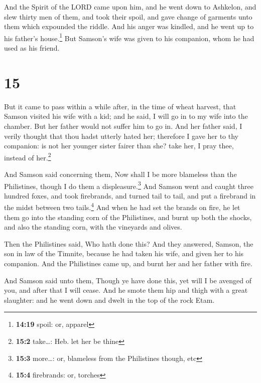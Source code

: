  And the Spirit of the LORD came upon him, and he went
down to Ashkelon, and slew thirty men of them, and took their spoil, and
gave change of garments unto them which expounded the riddle. And his
anger was kindled, and he went up to his father's house.\footnote{\textbf{14:19}
  spoil: or, apparel}  But Samson's wife was given to his
companion, whom he had used as his friend.

\hypertarget{section-14}{%
\section{15}\label{section-14}}

 But it came to pass within a while after, in the time of
wheat harvest, that Samson visited his wife with a kid; and he said, I
will go in to my wife into the chamber. But her father would not suffer
him to go in.  And her father said, I verily thought that
thou hadst utterly hated her; therefore I gave her to thy companion: is
not her younger sister fairer than she? take her, I pray thee, instead
of her.\footnote{\textbf{15:2} take\ldots: Heb. let her be thine}

 And Samson said concerning them, Now shall I be more
blameless than the Philistines, though I do them a
displeasure.\footnote{\textbf{15:3} more\ldots: or, blameless from the
  Philistines though, etc}  And Samson went and caught
three hundred foxes, and took firebrands, and turned tail to tail, and
put a firebrand in the midst between two tails.\footnote{\textbf{15:4}
  firebrands: or, torches}  And when he had set the brands
on fire, he let them go into the standing corn of the Philistines, and
burnt up both the shocks, and also the standing corn, with the vineyards
and olives.

 Then the Philistines said, Who hath done this? And they
answered, Samson, the son in law of the Timnite, because he had taken
his wife, and given her to his companion. And the Philistines came up,
and burnt her and her father with fire.

 And Samson said unto them, Though ye have done this, yet
will I be avenged of you, and after that I will cease. 
And he smote them hip and thigh with a great slaughter: and he went down
and dwelt in the top of the rock Etam.

